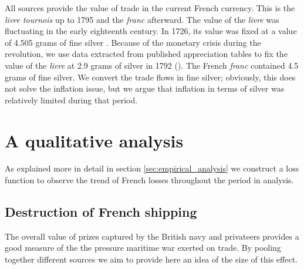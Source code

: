 \documentclass[12pt,a4paper,notitlepage,english]{article}
\begin{document}
All sources provide the value of trade in the current French currency. This is the \textit{livre tournois} up to 1795 and the \textit{franc} afterward. The value of the \textit{livre} was fluctuating in the early eighteenth century. In 1726, its value was fixed at a value of 4.505 grams of fine silver \citep{Dewailly1857}. Because of the monetary crisis during the revolution, we use data extracted from published appreciation tables to fix the value of the \textit{livre} at 2.9 grams of silver in 1792 (\cite{Hoffman2000}). The French \textit{franc} contained 4.5 grams of fine silver. We convert the trade flows in fine silver; obviously, this does not solve the inflation issue, but we argue that inflation in terms of silver was relatively limited during that period. 

\section{A qualitative analysis}
As explained more in detail in section \ref{sec:empirical_analysis} we construct a loss function to observe the trend of French losses throughout the period in analysis. 

\subsection{Destruction of French shipping}\label{section:DestructionofFrenchshipping}
The overall value of prizes captured by the British navy and privateers provides a good measure of the 
the pressure maritime war exerted on trade. By pooling together different sources we aim to provide here an idea of the size of this effect. 
\end{document}
